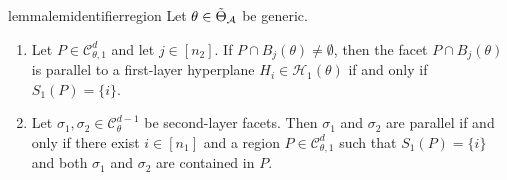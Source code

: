 \documentclass{article}
\newtheorem{lemma}[theorem]{Lemma}
\theoremstyle{definition}
\newcommand{\architecture}{\mathcal{A}}
\newcommand{\gparamspace}[1]{\Tilde{\Theta}_{#1}}
\newcommand{\complex}{\mathcal{C}}
\newcommand{\hyperplanes}[2]{\mathcal{H}_{#1}(#2)}
\begin{document}
\begin{restatable}{lemma}{lemidentifierregion}
\label{lem:identifierregion}
Let $\theta\in \gparamspace{\architecture}$ be generic. 
\begin{enumerate}[leftmargin=*]
    \item Let $P \in \complex_{\theta,1}^{d}$ and let $j\in[n_2]$. 
    If $P \cap B_{j}(\theta)\neq\emptyset$, then the facet
    $P \cap B_{j}(\theta)$ is parallel to a first-layer hyperplane 
    $H_i \in \hyperplanes{1}{\theta}$ if and only if 
    $S_1(P)=\{i\}$.
    
    \item Let $\sigma_1,\sigma_2 \in \complex_{\theta}^{d-1}$ be second-layer facets. 
    Then $\sigma_1$ and $\sigma_2$ are parallel if and only if there exist
    $i\in[n_1]$ and a region $P \in \complex_{\theta,1}^{d}$ such that
    $S_1(P)=\{i\}$
    and both $\sigma_1$ and $\sigma_2$ are contained in $P$.
\end{enumerate}
\end{restatable} 
\end{document}
